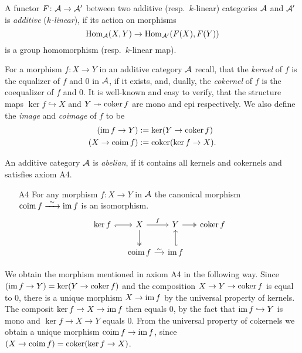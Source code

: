 \begin{definition}
    A functor $F \colon \mathcal A \to \mathcal A'$ between two additive (resp.\ $k$-linear) categories $\mathcal A$ and $\mathcal A'$ is \emph{additive} (\resp \emph{$k$-linear}), if its action on morphisms
    \[
        \operatorname{Hom}_\mathcal A(X, Y) \to \operatorname{Hom}_{\mathcal A'}(F(X), F(Y))
    \] 
    is a group homomorphism (resp.\ $k$-linear map).
\end{definition}

For a morphism $f\colon X \to Y$ in an additive category $\mathcal A$ recall, that the \emph{kernel} of $f$ is the equalizer of $f$ and $0$ in $\mathcal A$, if it exists, and, dually, the \emph{cokernel} of $f$ is the coequalizer of $f$ and $0$. It is well-known and easy to verify, that the structure maps $\ker f \hookrightarrow X$ and $Y \twoheadrightarrow \operatorname{coker} f$ are mono and epi respectively. We also define the \emph{image} and \emph{coimage} of $f$ to be
\begin{align*}
    (\operatorname{im} f \to Y) &:= \ker(Y \to \operatorname{coker} f) \\
    (X \to \operatorname{coim} f) &:= \operatorname{coker}(\ker f \to X).
\end{align*}

\begin{definition}
    An additive category $\mathcal A$ is \emph{abelian}, if it contains all kernels and cokernels and satisfies axiom A4.
    \begin{enumerate}
        \item[A4] For any morphism $f\colon X \to Y$ in $\mathcal A$ the canonical morphism $\operatorname{coim} f \xrightarrow{\ \sim \ } \operatorname{im} f$ is an isomorphism.
        \[\begin{tikzcd}[column sep = small]
            {\ker f} & X & Y & {\coker f} \\
            & \coim f & \im f
            \arrow[hook', from=1-1, to=1-2]
            \arrow["f", from=1-2, to=1-3]
            \arrow[two heads, from=1-2, to=2-2]
            \arrow[two heads, from=1-3, to=1-4]
            \arrow[hook', from=2-3, to=1-3]
            \arrow["\sim", from=2-2, to=2-3]
        \end{tikzcd}\] 
    \end{enumerate}
\end{definition}

\begin{remark}
    We obtain the morphism mentioned in axiom A4 in the following way. Since $(\operatorname{im} f \to Y) = \ker(Y \to \operatorname{coker} f)$ and the composition $X \to Y \to \operatorname{coker} f$ is equal to $0$, there is a unique morphism $X \to \operatorname{im} f$ by the universal property of kernels. The composit $\ker f \to X \to \operatorname{im} f$ then equals $0$, by the fact that $\operatorname{im} f \hookrightarrow Y$ is mono and $\ker f \to X \to Y$ equals $0$. From the universal property of cokernels we obtain a unique morphism $\operatorname{coim} f \to \operatorname{im} f$, since $(X \to \operatorname{coim} f) = \operatorname{coker}(\ker f \to X)$.
\end{remark}

